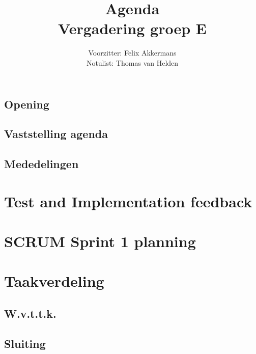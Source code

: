 \documentclass[a4paper]{article}
\title{Agenda \\ Vergadering groep E}
\author{Voorzitter: Felix Akkermans \\ Notulist: Thomas van Helden}
\begin{document}
\maketitle
\subsection*{Opening}
\subsection*{Vaststelling agenda}
\subsection*{Mededelingen}
\section{Test and Implementation feedback}
\section{SCRUM Sprint 1 planning}
\section{Taakverdeling}
\subsection*{W.v.t.t.k.}
\subsection*{Sluiting}
\end{document}
